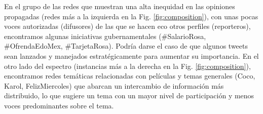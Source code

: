 En el grupo de las redes que muestran una alta inequidad en las opiniones propagadas (redes más a la izquierda en la Fig. \ref{fig:composition}), con unas pocas voces autorizadas (difusores) de las que se hacen eco otros perfiles (reporteros), encontramos algunas iniciativas gubernamentales (\#SalarioRosa, \#OfrendaEdoMex, \#TarjetaRosa). Podría darse el caso de que algunos tweets sean lanzados y manejados estratégicamente para aumentar su importancia. En el otro lado del espectro (instancias más a la derecha en la Fig. \ref{fig:composition}), encontramos redes temáticas relacionadas con películas y temas generales (Coco, Karol, FelizMiercoles) que abarcan un intercambio de información más distribuido, lo que sugiere un tema con un mayor nivel de participación y menos voces predominantes sobre el tema. 

